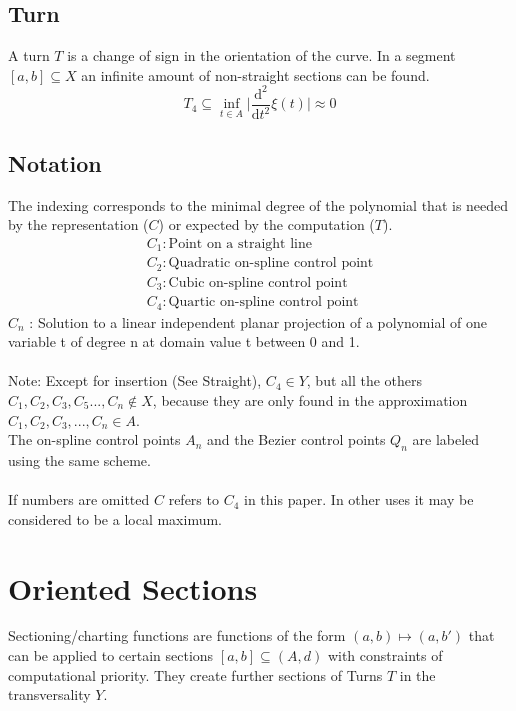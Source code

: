 \documentclass{report}
\begin{document}
\subsection{Turn}
A turn $T$ is a change of sign in the orientation of the curve. In a segment $[a,b] \subseteq X$ an infinite amount of non-straight sections can be found.
\begin{equation}
T_{4} \subseteq \inf_{t \in A} \lvert \frac{\mathrm{d}^2}{\mathrm{d}t^2}\xi(t) \rvert \approx 0
\end{equation}

\subsection{Notation}
The indexing corresponds to the minimal degree of the polynomial that is needed by the representation ($C$) or expected by the computation ($T$).
\begin{align}
C_{1} : \text{Point on a straight line}\\
C_{2} : \text{Quadratic on-spline control point}\\
C_{3} : \text{Cubic on-spline control point}\\
C_{4} : \text{Quartic on-spline control point}
\end{align}
$C_{n}$ : Solution to a linear independent planar projection of a polynomial of one variable t of degree n at domain value t between 0 and 1.\\\\
Note: Except for insertion (See Straight), $C_{4} \in Y$, but all the others $C_{1},C_{2},C_{3},C_{5}...,C_{n} \not\in X$, because they are only found in the approximation $C_{1},C_{2},C_{3},...,C_{n} \in A$.\\
The on-spline control points $A_{n}$ and the Bezier control points $Q_{n}$ are labeled using the same scheme.\\\\
If numbers are omitted $C$ refers to $C_{4}$ in this paper. In other uses it may be considered to be a local maximum.

\section*{Oriented Sections}
Sectioning/charting functions are functions of the form $(a,b) \mapsto (a,b')$ that can be applied to certain sections $[a,b] \subseteq (A,d)$ with constraints of computational priority. They create further sections of Turns $T$ in the transversality $Y$.
\end{document}
